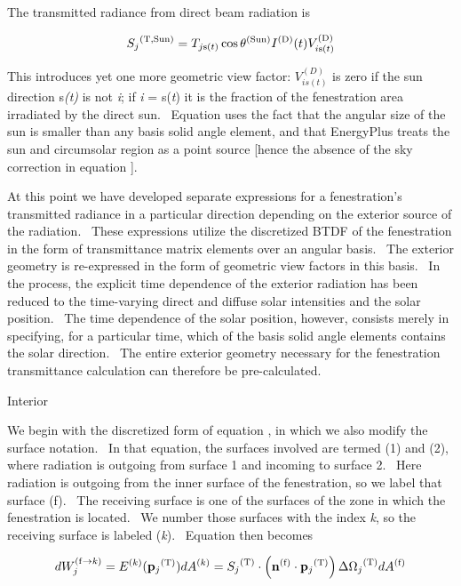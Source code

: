 The transmitted radiance from direct beam radiation is

\begin{equation}
{S_j}^{{\rm{(T, Sun)}}} = {T_{j{\rm{ s}}(t)}}\cos {\theta ^{{\rm{(Sun)}}}}{I^{{\rm{(D)}}}}(t)V_{i{\rm{ s(}}t{\rm{)}}}^{{\rm{(D)}}}
\end{equation}

This introduces yet one more geometric view factor: $V_{i s(t)}^{(D)}$ is zero if the sun direction s\emph{(t)} is not \emph{i}; if \emph{i} = s(\emph{t}) it is the fraction of the fenestration area irradiated by the direct sun.~ Equation uses the fact that the angular size of the sun is smaller than any basis solid angle element, and that EnergyPlus treats the sun and circumsolar region as a point source {[}hence the absence of the sky correction in equation {]}.

At this point we have developed separate expressions for a fenestration's~ transmitted radiance in a particular direction depending on the exterior source of the radiation.~ These expressions utilize the discretized BTDF of the fenestration in the form of transmittance matrix elements over an angular basis.~ The exterior geometry is re-expressed in the form of geometric view factors in this basis.~ In the process, the explicit time dependence of the exterior radiation has been reduced to the time-varying direct and diffuse solar intensities and the solar position.~ The time dependence of the solar position, however, consists merely in specifying, for a particular time, which of the basis solid angle elements contains the solar direction.~ The entire exterior geometry necessary for the fenestration transmittance calculation can therefore be pre-calculated.

Interior

We begin with the discretized form of equation , in which we also modify the surface notation.~ In that equation, the surfaces involved are termed (1) and (2), where radiation is outgoing from surface 1 and incoming to surface 2.~ Here radiation is outgoing from the inner surface of the fenestration, so we label that surface (f).~ The receiving surface is one of the surfaces of the zone in which the fenestration is located.~ We number those surfaces with the index \emph{k}, so the receiving surface is labeled (\emph{k}).~ Equation then becomes

\begin{equation}
dW_j^{{\rm{(f}} \to k{\rm{)}}} = {E^{{\rm{(}}k{\rm{)}}}}({{\bf{p}}_j}^{{\rm{(T)}}})d{A^{{\rm{(}}k{\rm{)}}}} = {S_j}^{{\rm{(T)}}} \cdot \left( {{{\bf{n}}^{{\rm{(f)}}}} \cdot {{\bf{p}}_j}^{{\rm{(T)}}}} \right)\Delta {\Omega_j}^{{\rm{(T)}}}d{A^{{\rm{(f)}}}}
\end{equation}

